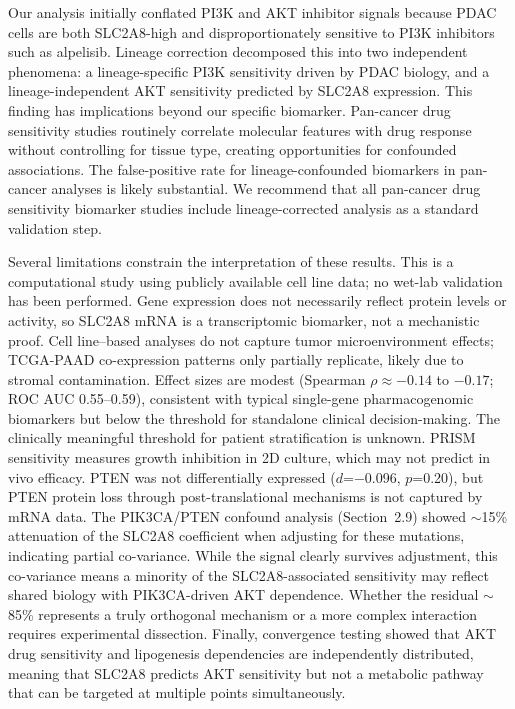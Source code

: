 \documentclass[12pt]{article}
\begin{document}
Our analysis initially conflated PI3K and AKT inhibitor signals because
PDAC cells are both SLC2A8-high and disproportionately sensitive to
PI3K inhibitors such as alpelisib. Lineage correction decomposed this
into two independent phenomena: a lineage-specific PI3K sensitivity
driven by PDAC biology, and a lineage-independent AKT sensitivity
predicted by SLC2A8 expression. This finding has implications beyond
our specific biomarker. Pan-cancer drug sensitivity studies routinely
correlate molecular features with drug response without controlling for
tissue type, creating opportunities for confounded associations. The
false-positive rate for lineage-confounded biomarkers in pan-cancer
analyses is likely substantial. We recommend that all pan-cancer drug
sensitivity biomarker studies include lineage-corrected analysis as a
standard validation step.

Several limitations constrain the interpretation of these results. This
is a computational study using publicly available cell line data; no
wet-lab validation has been performed. Gene expression does not
necessarily reflect protein levels or activity, so SLC2A8 mRNA is a
transcriptomic biomarker, not a mechanistic proof. Cell line--based
analyses do not capture tumor microenvironment effects; TCGA-PAAD
co-expression patterns only partially replicate, likely due to stromal
contamination. Effect sizes are modest (Spearman $\rho \approx -0.14$ to
$-0.17$; ROC AUC 0.55--0.59), consistent with typical single-gene
pharmacogenomic biomarkers but below the threshold for standalone clinical
decision-making. The clinically meaningful threshold for patient
stratification is unknown. PRISM
sensitivity measures growth inhibition in 2D culture, which may not
predict in vivo efficacy. PTEN was not differentially expressed
($d$=$-$0.096, $p$=0.20), but PTEN protein loss through
post-translational mechanisms is not captured by mRNA data.
The PIK3CA/PTEN confound analysis (Section~2.9) showed $\sim$15\%
attenuation of the SLC2A8 coefficient when adjusting for these mutations,
indicating partial co-variance. While the signal clearly survives
adjustment, this co-variance means a minority of the SLC2A8-associated
sensitivity may reflect shared biology with PIK3CA-driven AKT dependence.
Whether the residual $\sim$85\% represents a truly orthogonal mechanism
or a more complex interaction requires experimental dissection.
Finally,
convergence testing showed that AKT drug sensitivity and lipogenesis
dependencies are independently distributed, meaning that SLC2A8 predicts
AKT sensitivity but not a metabolic pathway that can be targeted at
multiple points simultaneously.
\end{document}
